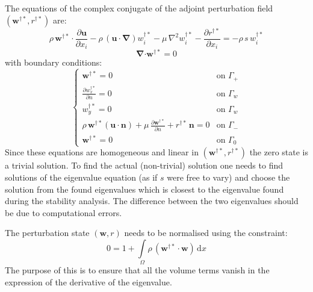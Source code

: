 \documentclass[12pt, a4paper]{article}
\begin{document}
        The equations of the complex conjugate of the adjoint perturbation field $(\mathbf{w^{\dagger*}},r^{\dagger*})$ are:
        \begin{equation}
            \rho \, \mathbf{w^{\dagger*} \cdot} \frac{\partial \mathbf{u}}{\partial x_i} - 
            \rho \, (\mathbf{u \cdot} \boldsymbol{\nabla}) w^{\dagger*}_i - 
            \mu \, \nabla^2 w^{\dagger*}_i - 
            \frac{\partial r^{\dagger*}}{\partial x_i} = 
            -\rho \, s \, w^{\dagger*}_i
        \end{equation}
        \begin{equation}
            \boldsymbol{\nabla} \mathbf{\cdot w^{\dagger*}} = 0
        \end{equation}
        with boundary conditions:
        \begin{equation}
        \begin{cases}
            \mathbf{w^{\dagger*}} = 0 & \text{on } \Gamma_+ \\
            \frac{\partial w^{\dagger*}_x}{\partial n} = 0 & \text{on } \Gamma_w \\
            w^{\dagger*}_y = 0 & \text{on } \Gamma_w \\
            \rho \, \mathbf{w^{\dagger*}} (\mathbf{u \cdot n}) + \mu \, \frac{\partial \mathbf{w^{\dagger*}}}{\partial n} + 
            r^{\dagger*} \, \mathbf{n} = 0 & \text{on } \Gamma_- \\
            \mathbf{w^{\dagger*}} = 0 & \text{on } \Gamma_0
        \end{cases}
        \end{equation}
        Since these equations are homogeneous and linear in $(\mathbf{w^{\dagger*}}, r^{\dagger*})$ the zero state is a trivial solution. To find the actual (non-trivial) solution one needs to find solutions of the eigenvalue equation (as if $s$ were free to vary) and choose the solution from the found eigenvalues which is closest to the eigenvalue found during the stability analysis. The difference between the two eigenvalues should be due to computational errors.
        
        The perturbation state $(\mathbf{w}, r)$ needs to be normalised using the constraint:
        \begin{equation}
            0 = 1 + \int\limits_{\Omega}
                \rho \, (\mathbf{w^{\dagger*} \cdot w})
            \, \mathrm{d} x
        \end{equation}
        The purpose of this is to ensure that all the volume terms vanish in the expression of the derivative of the eigenvalue.
        
\end{document}
